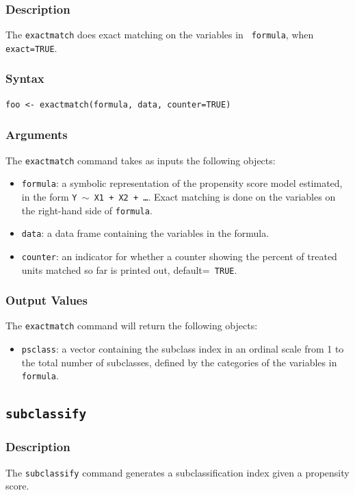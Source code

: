 \documentclass[oneside,letterpaper,titlepage]{article}
\begin{document}
\begin{appendix}
\subsubsection{Description}
The \texttt{exactmatch} does exact matching on the variables in {\tt
  formula}, when {\tt exact=TRUE}.

\subsubsection{Syntax}
\begin{verbatim}
foo <- exactmatch(formula, data, counter=TRUE)
\end{verbatim} 

\subsubsection{Arguments}
The \texttt{exactmatch} command takes as inputs the following
objects:
\begin{itemize}
\item \texttt{formula}: a symbolic representation of the propensity
  score model estimated, in the form {\tt Y $\sim$ X1 + X2 + \dots}.
  Exact matching is done on the variables on the right-hand side of
  \texttt{formula}.
\item \texttt{data}: a data frame containing the variables in the
  formula.
\item \texttt{counter}: an indicator for whether a counter showing the
  percent of treated units matched so far is printed out, default={\tt
    TRUE}.
\end{itemize}

\subsubsection{Output Values}
The \texttt{exactmatch} command will return the following objects:
\begin{itemize}
\item \texttt{psclass}: a vector containing the subclass index in an ordinal
  scale from 1 to the total number of subclasses, defined by the
  categories of the variables in {\tt formula}.
\end{itemize}

\subsection{\texttt{subclassify}}

\subsubsection{Description}
The \texttt{subclassify} command generates a subclassification index
given a propensity score. 


\end{appendix}
\end{document}
